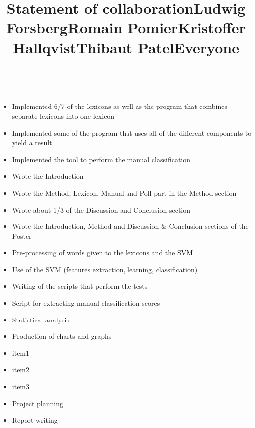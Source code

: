 \documentclass[a4paper,12pt]{report}
\begin{document}
\clearpage
\thispagestyle{empty}
\vspace*{2.15cm}
\title{\huge \textbf{Statement of collaboration}}
\vspace{1cm}\\
\title{\large \textbf{Ludwig Forsberg}}
\begin{itemize}
    \item Implemented 6/7 of the lexicons as well as the program that combines separate lexicons into one lexicon
    \item Implemented some of the program that uses all of the different components to yield a result
    \item Implemented the tool to perform the manual classification
    \item Wrote the Introduction
    \item Wrote the Method, Lexicon, Manual and Poll part in the Method section
    \item Wrote about 1/3 of the Discussion and Conclusion section
    \item Wrote the Introduction, Method and Discussion \& Conclusion sections of the Poster
\end{itemize}
\title{\large \textbf{Romain Pomier}}
\begin{itemize}
  \item Pre-processing of words given to the lexicons and the SVM
  \item Use of the SVM (features extraction, learning, classification)
  \item Writing of the scripts that perform the tests
\end{itemize}
\title{\large \textbf{Kristoffer Hallqvist}}
\begin{itemize}
  \item Script for extracting manual classification scores
  \item Statistical analysis
  \item Production of charts and graphs
\end{itemize}
\title{\large \textbf{Thibaut Patel}}
\begin{itemize}
  \item item1
  \item item2
  \item item3
\end{itemize}
\title{\large \textbf{Everyone}}
\begin{itemize}
  \item Project planning
  \item Report writing
\end{itemize}
\end{document}
